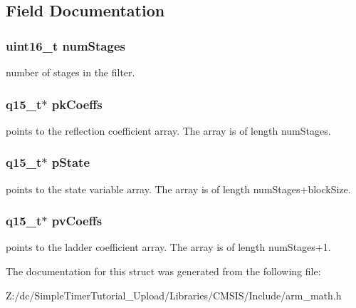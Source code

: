 \subsection{Field Documentation}
\hypertarget{structarm__iir__lattice__instance__q15_a4cceb90547b3e585d4c7aabaa8057212}{
\subsubsection[{num\-Stages}]{\setlength{\rightskip}{0pt plus 5cm}uint16\-\_\-t num\-Stages}}\label{structarm__iir__lattice__instance__q15_a4cceb90547b3e585d4c7aabaa8057212}
number of stages in the filter. \hypertarget{structarm__iir__lattice__instance__q15_a12497c299b0341c18d497f8ab3465084}{
\subsubsection[{pk\-Coeffs}]{\setlength{\rightskip}{0pt plus 5cm}q15\-\_\-t$\ast$ pk\-Coeffs}}\label{structarm__iir__lattice__instance__q15_a12497c299b0341c18d497f8ab3465084}
points to the reflection coefficient array. The array is of length num\-Stages. \hypertarget{structarm__iir__lattice__instance__q15_ae29dfdb736374fcddaeaec4b7770170c}{
\subsubsection[{p\-State}]{\setlength{\rightskip}{0pt plus 5cm}q15\-\_\-t$\ast$ p\-State}}\label{structarm__iir__lattice__instance__q15_ae29dfdb736374fcddaeaec4b7770170c}
points to the state variable array. The array is of length num\-Stages+block\-Size. \hypertarget{structarm__iir__lattice__instance__q15_a52866ed127c7b2a8a102e2ed1a2ebab8}{
\subsubsection[{pv\-Coeffs}]{\setlength{\rightskip}{0pt plus 5cm}q15\-\_\-t$\ast$ pv\-Coeffs}}\label{structarm__iir__lattice__instance__q15_a52866ed127c7b2a8a102e2ed1a2ebab8}
points to the ladder coefficient array. The array is of length num\-Stages+1. 

The documentation for this struct was generated from the following file\-:\begin{DoxyCompactItemize}
\item 
Z\-:/dc/\-Simple\-Timer\-Tutorial\-\_\-\-Upload/\-Libraries/\-C\-M\-S\-I\-S/\-Include/arm\-\_\-math.\-h\end{DoxyCompactItemize}
